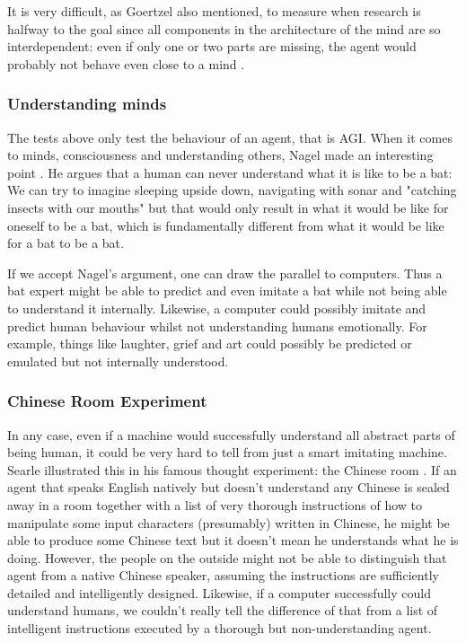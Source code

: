 \documentclass[11pt]{article}
\begin{document}
It is very difficult, as Goertzel also mentioned, to measure when research is halfway to the goal since all components in the architecture of the mind are so interdependent: even if only one or two parts are missing, the agent would probably not behave even close to a mind \cite{goertzel2012agi}.

\subsubsection*{Understanding minds}

The tests above only test the behaviour of an agent, that is AGI. When it comes to minds, consciousness and understanding others, Nagel made an interesting point \cite{nagel1974like}. He argues that a human can never understand what it is like to be a bat: We can try to imagine sleeping upside down, navigating with sonar and "catching insects with our mouths" but that would only result in what it would be like for oneself to be a bat, which is fundamentally different from what it would be like for a bat to be a bat.


If we accept Nagel's argument, one can draw the parallel to computers. Thus a bat expert might be able to predict and even imitate a bat while not being able to understand it internally. Likewise, a computer could possibly imitate and predict human behaviour whilst not understanding humans emotionally. For example, things like laughter, grief and art could possibly be predicted or emulated but not internally understood.

\subsubsection*{Chinese Room Experiment}
\label{sec:chinese_room}

In any case, even if a machine would successfully understand all abstract parts of being human, it could be very hard to tell from just a smart imitating machine. Searle illustrated this in his famous thought experiment: the Chinese room \cite{searle1980minds}. If an agent that speaks English natively but doesn't understand any Chinese is sealed away in a room together with a list of very thorough instructions of how to manipulate some input characters (presumably) written in Chinese, he might be able to produce some Chinese text but it doesn't mean he understands what he is doing. However, the people on the outside might not be able to distinguish that agent from a native Chinese speaker, assuming the instructions are sufficiently detailed and intelligently designed. Likewise, if a computer successfully could understand humans, we couldn't really tell the difference of that from a list of intelligent instructions executed by a thorough but non-understanding agent.
\end{document}
